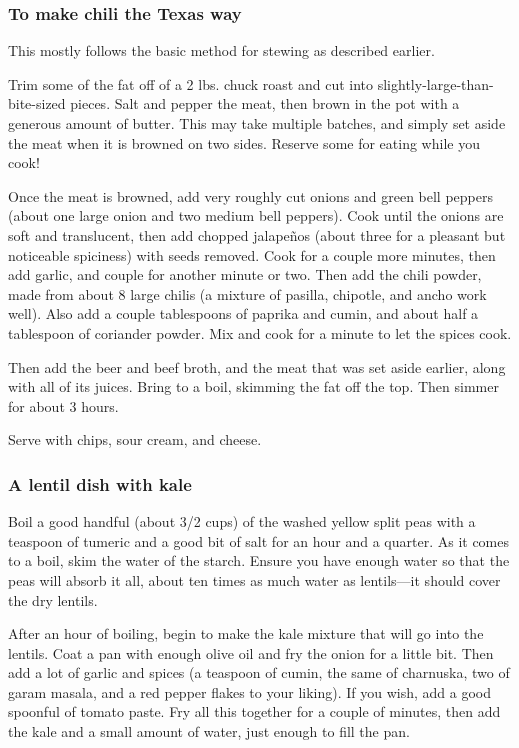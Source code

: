 \documentclass[10pt]{article}
\begin{document}
\subsubsection*{To make chili the Texas way}

This mostly follows the basic method for stewing as described earlier.

Trim some of the fat off of a 2 lbs. chuck roast and cut into slightly-large-than-bite-sized pieces.
Salt and pepper the meat, then brown in the pot with a generous amount of butter.
This may take multiple batches, and simply set aside the meat when it is browned on two sides.
Reserve some for eating while you cook!

Once the meat is browned, add very roughly cut onions and green bell peppers (about one large onion and two medium bell peppers).
Cook until the onions are soft and translucent, then add chopped jalape\~{n}os (about three for a pleasant but noticeable spiciness) with seeds removed.
Cook for a couple more minutes, then add garlic, and couple for another minute or two.
Then add the chili powder, made from about 8 large chilis (a mixture of pasilla, chipotle, and ancho work well).
Also add a couple tablespoons of paprika and cumin, and about half a tablespoon of coriander powder.
Mix and cook for a minute to let the spices cook.

Then add the beer and beef broth, and the meat that was set aside earlier, along with all of its juices.
Bring to a boil, skimming the fat off the top.
Then simmer for about 3 hours.

Serve with chips, sour cream, and cheese.

\subsubsection*{A lentil dish with kale}

Boil a good handful (about 3/2 cups) of the washed yellow split peas with a teaspoon of tumeric and a good bit of salt for an hour and a quarter.
As it comes to a boil, skim the water of the starch.
Ensure you have enough water so that the peas will absorb it all, about ten times as much water as lentils---it should cover the dry lentils.

After an hour of boiling, begin to make the kale mixture that will go into the lentils.
Coat a pan with enough olive oil and fry the onion for a little bit.
Then add a lot of garlic and spices (a teaspoon of cumin, the same of charnuska, two of garam masala, and a red pepper flakes to your liking).
If you wish, add a good spoonful of tomato paste.
Fry all this together for a couple of minutes, then add the kale and a small amount of water, just enough to fill the pan.
\end{document}
